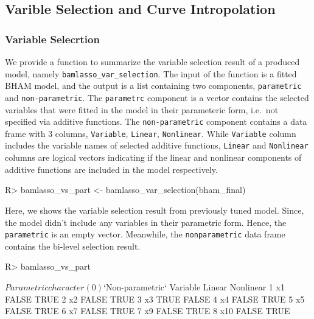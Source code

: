 \documentclass[
]{jss}
\begin{document}
\subsection{Varible Selection and Curve Intropolation}
\subsubsection{Variable Selecrtion}

We provide a function to summarize the variable selection result of a
produced model, namely \texttt{bamlasso\_var\_selection}. The input of
the function is a fitted BHAM model, and the output is a list containing
two components, \texttt{parametric} and \texttt{non-parametric}. The
\texttt{parametrc} component is a vector contains the selected variables
that were fitted in the model in their parameteric form, i.e.~not
specified via additive functions. The \texttt{non-parametric} component
contains a data frame with 3 columns, \texttt{Variable},
\texttt{Linear}, \texttt{Nonlinear}. While \texttt{Variable} column
includes the variable names of selected additive functions,
\texttt{Linear} and \texttt{Nonlinear} columns are logical vectors
indicating if the linear and nonlinear components of additive functions
are included in the model respectively.

\begin{CodeChunk}
\begin{CodeInput}
R> bamlasso_vs_part <- bamlasso_var_selection(bham_final)
\end{CodeInput}
\end{CodeChunk}

Here, we shows the variable selection result from previously tuned
model. Since, the model didn't include any variables in their parametric
form. Hence, the \texttt{parametric} is an empty vector. Meanwhile, the
\texttt{nonparametric} data frame contains the bi-level selection
result.

\begin{CodeChunk}
\begin{CodeInput}
R> bamlasso_vs_part
\end{CodeInput}
\begin{CodeOutput}
$Parametric
character(0)

$`Non-parametric`
  Variable Linear Nonlinear
1       x1  FALSE      TRUE
2       x2  FALSE      TRUE
3       x3   TRUE     FALSE
4       x4  FALSE      TRUE
5       x5  FALSE      TRUE
6       x7  FALSE      TRUE
7       x9  FALSE      TRUE
8      x10  FALSE      TRUE
\end{CodeOutput}
\end{CodeChunk}
\end{document}
